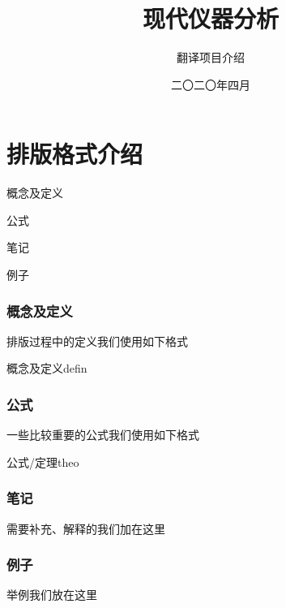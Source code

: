 \documentclass[cn,11pt,chinese]{elegantbook}
\title{现代仪器分析}
\subtitle{翻译项目介绍}
\date{二〇二〇年四月}
\begin{document}
\maketitle
\frontmatter


\vskip 1.5cm

\tableofcontents

\mainmatter
\chapter{排版格式介绍}
\begin{introduction}
    \item 概念及定义
    \item 公式
    \item 笔记
    \item 例子
\end{introduction}

\subsection{概念及定义}
排版过程中的定义我们使用如下格式
\begin{definition*}{概念及定义}{defin}
    
\end{definition*}

\subsection{公式}
一些比较重要的公式我们使用如下格式
\begin{theorem*}{公式/定理}{theo}
    
\end{theorem*}

\subsection{笔记}
\note 需要补充、解释的我们加在这里

\subsection{例子}
\begin{example}
    举例我们放在这里
\end{example}
\end{document}
